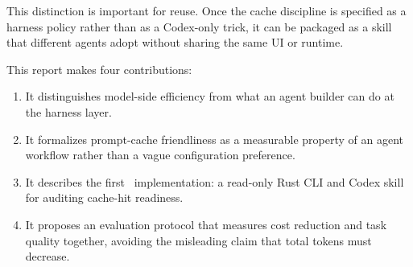 This distinction is important for reuse. Once the cache discipline is specified as a harness policy rather than as a Codex-only trick, it can be packaged as a skill that different agents adopt without sharing the same UI or runtime.

This report makes four contributions:
\begin{enumerate}[leftmargin=2em]
    \item It distinguishes model-side efficiency from what an agent builder can do at the harness layer.
    \item It formalizes prompt-cache friendliness as a measurable property of an agent workflow rather than a vague configuration preference.
    \item It describes the first \toolname\ implementation: a read-only Rust CLI and Codex skill for auditing cache-hit readiness.
    \item It proposes an evaluation protocol that measures cost reduction and task quality together, avoiding the misleading claim that total tokens must decrease.
\end{enumerate}
